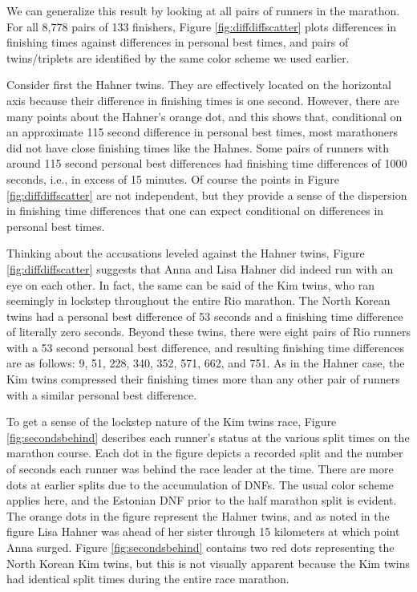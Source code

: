 \documentclass[12pt,titlepage]{article}
\begin{document}
We can generalize this result by looking at all pairs of runners in
the marathon.  For all 8,778 pairs of 133 finishers, Figure
\ref{fig:diffdiffscatter} plots differences in finishing times against
differences in personal best times, and pairs of twins/triplets are
identified by the same color scheme we used earlier.

Consider first the Hahner twins.  They are effectively located on the
horizontal axis because their difference in finishing times is one
second.  However, there are many points about the Hahner's orange dot,
and this shows that, conditional on an approximate 115 second
difference in personal best times, most marathoners did not have close
finishing times like the Hahnes.  Some pairs of runners with around
115 second personal best differences had finishing time differences of
1000 seconds, i.e., in excess of 15 minutes.  Of course the points in
Figure \ref{fig:diffdiffscatter} are not independent, but they provide
a sense of the dispersion in finishing time differences that one can
expect conditional on differences in personal best times.

Thinking about the accusations leveled against the Hahner twins,
Figure \ref{fig:diffdiffscatter} suggests that Anna and Lisa Hahner
did indeed run with an eye on each other.  In fact, the same can be
said of the Kim twins, who ran seemingly in lockstep throughout the
entire Rio marathon.  The North Korean twins had a personal best
difference of 53 seconds and a finishing time difference of literally
zero seconds.  Beyond these twins, there were eight pairs of Rio
runners with a 53 second personal best difference, and resulting
finishing time differences are as follows: 9, 51, 228, 340, 352, 571,
662, and 751.  As in the Hahner case, the Kim twins compressed their
finishing times more than any other pair of runners with a similar
personal best difference.

To get a sense of the lockstep nature of the Kim twins race, Figure
\ref{fig:secondsbehind} describes each runner's status at the various
split times on the marathon course.  Each dot in the figure depicts a
recorded split and the number of seconds each runner was behind the
race leader at the time.  There are more dots at earlier splits due to
the accumulation of DNFs.  The usual color scheme applies here, and
the Estonian DNF prior to the half marathon split is evident.  The
orange dots in the figure represent the Hahner twins, and as noted in
the figure Lisa Hahner was ahead of her sister through 15 kilometers
at which point Anna surged.  Figure \ref{fig:secondsbehind} contains
two red dots representing the North Korean Kim twins, but this is not
visually apparent because the Kim twins had identical split times
during the entire race marathon.
\end{document}
